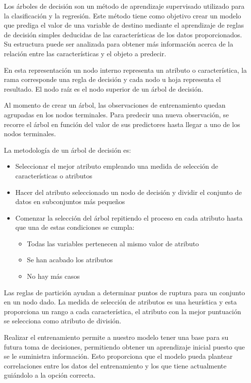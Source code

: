 \documentclass[journal]{IEEEtran}                                                          %
\begin{document}
            Los árboles de decisión son un método de aprendizaje supervisado utilizado para la clasificación y la regresión. Este método tiene como objetivo crear un modelo que prediga el valor de una variable de destino mediante el aprendizaje de reglas de decisión simples deducidas de las características de los datos proporcionados. Su estructura puede ser analizada para obtener más información acerca de la relación entre las características y el objeto a predecir.

            En esta representación un nodo interno representa un atributo o característica, la rama corresponde una regla de decisión y cada nodo u hoja representa el resultado. El nodo raíz es el nodo superior de un árbol de decisión.

            Al momento de crear un árbol, las observaciones de entrenamiento quedan agrupadas en los nodos terminales. Para predecir una nueva observación, se recorre el árbol en función del valor de sus predictores hasta llegar a uno de los nodos terminales.

            La metodología de un árbol de decisión es:
            \begin{itemize}
                \item Seleccionar el mejor atributo empleando una medida de selección de características o atributos
                \item Hacer del atributo seleccionado un nodo de decisión y dividir el conjunto de datos en subconjuntos más pequeños
                \item Comenzar la selección del árbol repitiendo el proceso en cada atributo hasta que una de estas condiciones se cumpla: \begin{itemize}
                    \item Todas las variables pertenecen al mismo valor de atributo
                    \item Se han acabado los atributos
                    \item No hay más casos
                \end{itemize}
            \end{itemize}

            Las reglas de partición ayudan a determinar puntos de ruptura para un conjunto en un nodo dado. La medida de selección de atributos es una heurística y esta proporciona un rango a cada característica, el atributo con la mejor puntuación se selecciona como atributo de división.

            Realizar el entrenamiento permite a nuestro modelo tener una base para su futura toma de decisiones, permitiendo obtener un aprendizaje inicial puesto que se le suministra información. Esto proporciona que el modelo pueda plantear correlaciones entre los datos del entrenamiento y los que tiene actualmente guiándolo a la opción correcta.
        
\end{document}
